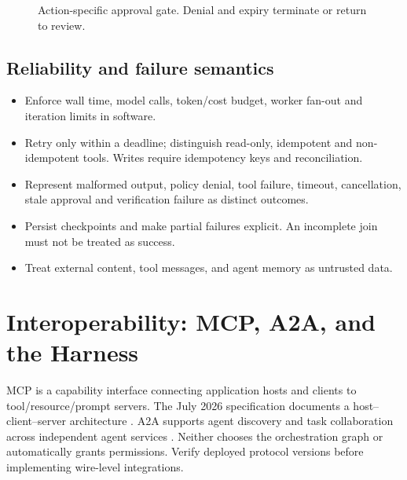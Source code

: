 \begin{figure}[htbp]\centering
{}
\caption{Action-specific approval gate. Denial and expiry terminate or return to review.}
\label{fig:approval}
\end{figure}

\subsection{Reliability and failure semantics}
\begin{itemize}
\item Enforce wall time, model calls, token/cost budget, worker fan-out and iteration limits in software.
\item Retry only within a deadline; distinguish read-only, idempotent and non-idempotent tools. Writes require idempotency keys and reconciliation.
\item Represent malformed output, policy denial, tool failure, timeout, cancellation, stale approval and verification failure as distinct outcomes.
\item Persist checkpoints and make partial failures explicit. An incomplete join must not be treated as success.
\item Treat external content, tool messages, and agent memory as untrusted data.
\end{itemize}

\section{Interoperability: MCP, A2A, and the Harness}
MCP is a capability interface connecting application hosts and clients to tool/resource/prompt servers. The July 2026 specification documents a host--client--server architecture \cite{mcp}. A2A supports agent discovery and task collaboration across independent agent services \cite{a2a}. Neither chooses the orchestration graph or automatically grants permissions. Verify deployed protocol versions before implementing wire-level integrations.


